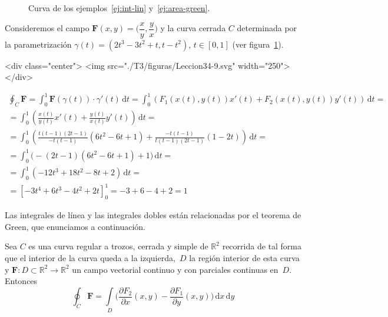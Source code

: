 \begin{latexonly}
\begin{figure}
\begin{center}
\end{center}
\caption{Curva de los ejemplos~\ref{ej:int-lin} y~\ref{ej:area-green}.}\label{fig:ej-int-lin}
\end{figure}
\end{latexonly}
\begin{ejemplo}\label{ej:int-lin}
Consideremos el campo $\boldsymbol F(x,y)=\Big(\dfrac{x}{y},\dfrac{y}x\Big)$ y la curva cerrada $C$ determinada por la parametrización
$\gamma(t)=(2t^3-3t^2+t,t-t^2)$, $t\in[0,1]$ (ver figura~\ref{fig:ej-int-lin}).
\begin{rawhtml}
<div class="center">
<img src="./T3/figuras/Leccion34-9.svg" width="250">
</div>
\end{rawhtml}
\begin{multline*}
\oint_{C} \boldsymbol{F} = 
\int_0^1 \boldsymbol{F}(\gamma(t))\cdot\gamma'(t)\,\mathrm dt
= \int_0^1 (F_1(x(t),y(t))x'(t)+F_2(x(t),y(t))y'(t))\,\mathrm dt =\\
= \int_0^1 \left(\frac{x(t)}{y(t)}x'(t)+\frac{y(t)}{x(t)}y'(t)\right)\,\mathrm dt =\\
= \int_0^1 \left(\frac{t(t-1)(2t-1)}{-t(t-1)}(6t^2-6t+1)+
\frac{-t(t-1)}{t(t-1)(2t-1)}(1-2t)\right)\,\mathrm dt =\\
= \int_0^1 \big(-(2t-1)(6t^2-6t+1)+1\big)\,\mathrm dt =\\
= \int_0^1 (-12t^3+18t^2-8t+2)\,\mathrm dt =\\
= \left[-3t^4+6t^3-4t^2+2t\right]_0^1=-3+6-4+2=1\tag*{\fej}
\end{multline*}
\end{ejemplo}

Las integrales de línea y las integrales dobles están relacionadas por el teorema de Green, que enunciamos a continuación.
%
\begin{teorema}[de Green]\label{th:green}
Sea $C$ es una curva regular a trozos, cerrada y simple de $\mathbb{R}^2$ recorrida de tal forma que el interior de la curva queda a la izquierda,~$\mathit D$ la región interior de esta curva y
$\boldsymbol{F}\colon \mathit D\subset\mathbb{R}^2\to\mathbb{R}^2$ un campo vectorial continuo y con parciales continuas en~$\mathit D$.
Entonces
\[
\oint_C \boldsymbol{F}  =  \int\limits_{\mathit D} \Big(\dfrac{\partial F_2}{\partial x}(x,y) - \dfrac{\partial F_1}{\partial y}(x,y)\Big)\,\mathrm dx\,\mathrm dy
\]
\end{teorema}

